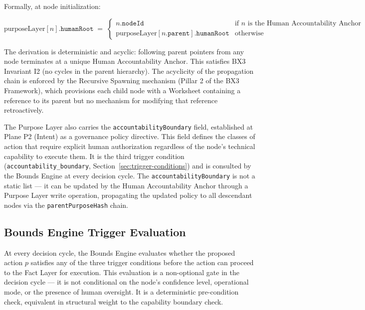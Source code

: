Formally, at node initialization:

\begin{equation}
\text{purposeLayer}[n].\texttt{humanRoot} \;=\;
\begin{cases}
n.\texttt{nodeId} & \text{if } n \text{ is the Human Accountability Anchor} \\
\text{purposeLayer}[n.\texttt{parent}].\texttt{humanRoot} & \text{otherwise}
\end{cases}
\label{eq:human-root-propagation}
\end{equation}

The derivation is deterministic and acyclic: following parent pointers from any node terminates at a unique Human Accountability Anchor. This satisfies BX3 Invariant I2 (no cycles in the parent hierarchy). The acyclicity of the propagation chain is enforced by the Recursive Spawning mechanism (Pillar 2 of the BX3 Framework), which provisions each child node with a Worksheet containing a reference to its parent but no mechanism for modifying that reference retroactively.

The Purpose Layer also carries the \texttt{accountabilityBoundary} field, established at Plane P2 (Intent) as a governance policy directive. This field defines the classes of action that require explicit human authorization regardless of the node's technical capability to execute them. It is the third trigger condition (\texttt{accountability\_boundary}, Section~\ref{sec:trigger-conditions}) and is consulted by the Bounds Engine at every decision cycle. The \texttt{accountabilityBoundary} is not a static list --- it can be updated by the Human Accountability Anchor through a Purpose Layer write operation, propagating the updated policy to all descendant nodes via the \texttt{parentPurposeHash} chain.

\subsection{Bounds Engine Trigger Evaluation}
\label{sec:bounds-engine-trigger}

At every decision cycle, the Bounds Engine evaluates whether the proposed action $p$ satisfies any of the three trigger conditions before the action can proceed to the Fact Layer for execution. This evaluation is a non-optional gate in the decision cycle --- it is not conditional on the node's confidence level, operational mode, or the presence of human oversight. It is a deterministic pre-condition check, equivalent in structural weight to the capability boundary check.

